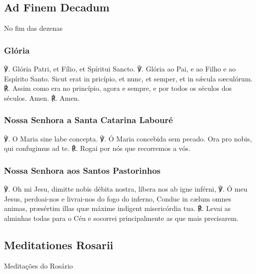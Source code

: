 \subsection{Ad Finem Decadum}
\begin{nscenter}No fim das dezenas\end{nscenter}
\subsubsection{Glória}
\begin{paracol}{2}
{\redx ℣.} Glória Patri, et Fílio, et Spíritui Sancto.
\switchcolumn
{\redx ℣.} Glória ao Pai, e ao Filho e ao Espírito Santo.
 Sicut erat in pricípio, et nunc, et semper, et in sǽcula sæculórum.
\switchcolumn
{\redx ℟.} Assim como era no princípio, agora e sempre, e por todos os séculos dos
séculos.
 Amen.
\switchcolumn
{\redx ℟.} Amen.
\end{paracol}

\subsubsection{Nossa Senhora a Santa Catarina Labouré}
\begin{paracol}{2}
{\redx ℣.} O Maria sine labe concepta.
\switchcolumn
{\redx ℣.} Ó Maria concebida sem pecado.
 Ora pro nobis, qui confugimus ad te.
\switchcolumn
{\redx ℟.} Rogai por nós que recorremos a vós.
\end{paracol}

\subsubsection{Nossa Senhora aos Santos Pastorinhos}

\begin{paracol}{2}
{\redx ℣.} Oh mi Jesu, dimitte nobis débita nostra, líbera nos ab igne inférni,
\switchcolumn
{\redx ℣.} Ó meu Jesus, perdoai-nos e livrai-nos do fogo do inferno,
 Conduc in cælum omnes animas, præsértim illas quæ máxime indigent
misericórdia tua.
\switchcolumn
{\redx ℟.} Levai as alminhas todas para o Céu e socorrei principalmente as que mais
precisarem.
\end{paracol}

\subsection{Meditationes Rosarii}
\begin{nscenter}Meditações do Rosário\end{nscenter}

